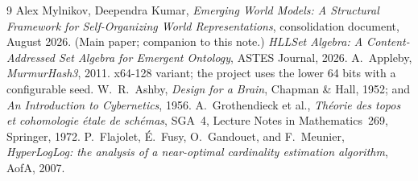 \documentclass[11pt,a4paper]{article}
\theoremstyle{remark}
\begin{document}
\begin{thebibliography}{9}
 Alex Mylnikov, Deependra Kumar, \textit{Emerging World Models: A Structural
Framework for Self-Organizing World Representations}, consolidation document,
August 2026. (Main paper; companion to this note.)
 \textit{HLLSet Algebra: A Content-Addressed Set Algebra for
Emergent Ontology}, ASTES Journal, 2026.
 A.~Appleby, \textit{MurmurHash3}, 2011. x64-128 variant; the
project uses the lower 64 bits with a configurable seed.
 W.~R.~Ashby, \textit{Design for a Brain}, Chapman \& Hall,
1952; and \textit{An Introduction to Cybernetics}, 1956.
 A.~Grothendieck et al., \textit{Th\'eorie des topos
et cohomologie \'etale de sch\'emas}, SGA~4, Lecture Notes in Mathematics~269,
Springer, 1972.
 P.~Flajolet, \'E.~Fusy, O.~Gandouet, and F.~Meunier,
\textit{HyperLogLog: the analysis of a near-optimal cardinality estimation
algorithm}, AofA, 2007.
\end{thebibliography}
\end{document}
